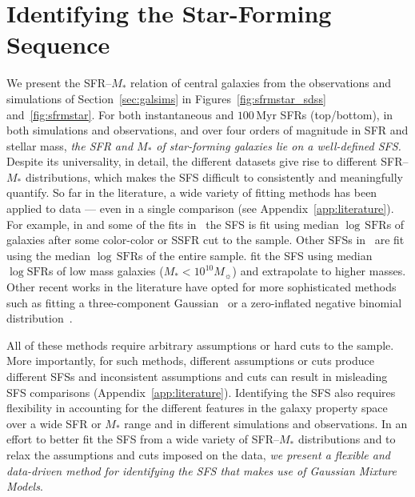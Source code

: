 \documentclass[tighten, preprint]{aastex62}
\begin{document}

\section{Identifying the Star-Forming Sequence}\label{sec:sfmsfit}
We present the SFR--$M_*$ relation of central galaxies from the 
observations and simulations of Section~\ref{sec:galsims} in 
Figures~\ref{fig:sfrmstar_sdss} and~\ref{fig:sfrmstar}. For both 
instantaneous and $100\,\mathrm{Myr}$ SFRs (top/bottom),
in both simulations and observations, and over four orders of magnitude 
in SFR and stellar mass, \emph{the SFR and $M_*$ of star-forming galaxies 
lie on a well-defined SFS.} Despite its universality, in detail, the different 
datasets give rise to different SFR--$M_*$ distributions, which makes the 
SFS difficult to consistently and meaningfully quantify. 
So far in the literature, a wide variety of fitting methods has been applied to 
data --- even in a single comparison (see Appendix~\ref{app:literature}). 
For example, in \cite{lee2015} and some of the fits in~\cite{somerville2015}
the SFS is fit using median $\log\,\mathrm{SFR}$s of galaxies after some 
color-color or SSFR cut to the sample. Other SFSs in~\cite{somerville2015} 
are fit using the median $\log\,\mathrm{SFR}$s of the entire sample. 
\cite{bluck2016} fit the SFS using median $\log\mathrm{SFR}$s of low mass 
galaxies ($M_* < 10^{10}M_\sun$) and extrapolate to higher masses. %
Other recent works in the literature have opted for more sophisticated 
methods such as fitting a three-component Gaussian~\citep{bisigello2018} 
or a zero-inflated negative binomial distribution~\citep{feldmann2017}. 

All of these methods require arbitrary assumptions or hard cuts to the 
sample. More importantly, for such methods, different assumptions 
or cuts produce different SFSs and inconsistent assumptions and cuts 
can result in misleading SFS comparisons (Appendix~\ref{app:literature}).
Identifying the SFS also requires flexibility in accounting 
for the different features in the galaxy property space over a wide SFR or 
$M_*$ range and in different simulations and observations.
In an effort to better fit the SFS from a wide variety of SFR--$M_*$ 
distributions and to relax the assumptions and cuts imposed on the data, 
\emph{we present a flexible and data-driven method for identifying the SFS 
that makes use of Gaussian Mixture Models}.
\end{document}
